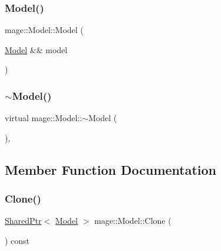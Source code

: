 \hypertarget{classmage_1_1_model_a085272d7cb82587094f18747ecc5aad0}{}\label{classmage_1_1_model_a085272d7cb82587094f18747ecc5aad0} 
\subsubsection{\texorpdfstring{Model()}{Model()}\hspace{0.1cm}{\footnotesize\ttfamily [3/3]}}
{\footnotesize\ttfamily mage\+::\+Model\+::\+Model (\begin{DoxyParamCaption}\item[{\hyperlink{classmage_1_1_model}{Model} \&\&}]{model }\end{DoxyParamCaption})\hspace{0.3cm}{\ttfamily [default]}}

\hypertarget{classmage_1_1_model_a802f7bcb3d15d3baab4a8d383d9e9293}{}\label{classmage_1_1_model_a802f7bcb3d15d3baab4a8d383d9e9293} 
\subsubsection{\texorpdfstring{$\sim$\+Model()}{~Model()}}
{\footnotesize\ttfamily virtual mage\+::\+Model\+::$\sim$\+Model (\begin{DoxyParamCaption}{ }\end{DoxyParamCaption})\hspace{0.3cm}{\ttfamily [virtual]}, {\ttfamily [default]}}



\subsection{Member Function Documentation}
\hypertarget{classmage_1_1_model_ac0043eb1766f8a5be05284fbb9c3e912}{}\label{classmage_1_1_model_ac0043eb1766f8a5be05284fbb9c3e912} 
\subsubsection{\texorpdfstring{Clone()}{Clone()}}
{\footnotesize\ttfamily \hyperlink{namespacemage_a1e01ae66713838a7a67d30e44c67703e}{Shared\+Ptr}$<$ \hyperlink{classmage_1_1_model}{Model} $>$ mage\+::\+Model\+::\+Clone (\begin{DoxyParamCaption}{ }\end{DoxyParamCaption}) const}

